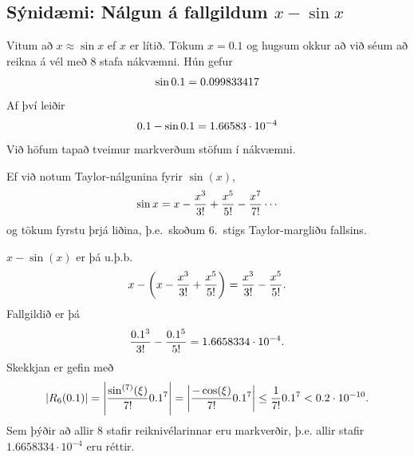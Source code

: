 \documentclass[A4paper,10pt,icelandic]{sphinxmanual}
\begin{document}
\subsection{Sýnidæmi: Nálgun á fallgildum \(x-\sin x\)}
\label{kafli01:synidaemi-nalgun-a-fallgildum}
Vitum að \(x \approx \sin x\) ef \(x\) er lítið. Tökum
\(x=0.1\) og hugsum okkur að við séum að reikna á vél með 8 stafa
nákvæmni. Hún gefur
\begin{gather}
\begin{split}\sin 0.1 = 0.099833417\end{split}\notag
\end{gather}
Af því leiðir
\begin{gather}
\begin{split}0.1 - \sin 0.1 = 1.66583\cdot 10^{-4}\end{split}\notag
\end{gather}
Við höfum tapað tveimur markverðum stöfum í nákvæmni.

Ef við notum Taylor-nálgunina fyrir \(\sin(x)\),
\begin{gather}
\begin{split}\sin x = x - \frac{x^3}{3!} + \frac{x^5}{5!}
    - \frac{x^7}{7!} \cdots\end{split}\notag
\end{gather}
og tökum fyrstu þrjá liðina, þ.e. skoðum 6. stigs Taylor-margliðu
fallsins.

\(x-\sin(x)\) er þá u.þ.b.
\begin{gather}
\begin{split}x - \left(x - \frac{x^3}{3!} + \frac{x^5}{5!}\right) = \frac{x^3}{3!} - \frac{x^5}{5!}.\end{split}\notag
\end{gather}
Fallgildið er þá
\begin{gather}
\begin{split}\frac {0.1^3}{3!} - \frac{0.1^5}{5!} = 1.6658334 \cdot 10^{-4}.\end{split}\notag
\end{gather}
Skekkjan er gefin með
\begin{gather}
\begin{split}|R_6(0.1)| = \left|\frac{\sin^{(7)}(\xi)}{7!}0.1^7\right|
    = \left|\frac{-\cos(\xi)}{7!}0.1^7\right|
    \leq \frac{1}{7!}0.1^7 < 0.2\cdot 10^{-10}.\end{split}\notag
\end{gather}
Sem þýðir að allir 8 stafir reiknivélarinnar eru markverðir, þ.e.
allir stafir \(1.6658334 \cdot 10^{-4}\) eru réttir.
\end{document}
